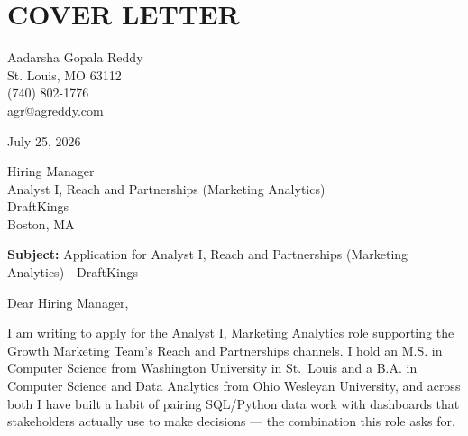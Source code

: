 \documentclass[10pt, letterpaper]{article}
\begin{document}
\vspace{\headerSpacing}
\section*{COVER LETTER}

\vspace{\headerSpacing}
\begin{onecolentry}
	Aadarsha Gopala Reddy\\
	St. Louis, MO 63112\\
	(740) 802-1776\\
	agr@agreddy.com\\
\end{onecolentry}

\vspace{\headerSpacing}
\begin{onecolentry}
	July 25, 2026\\
\end{onecolentry}

\vspace{\headerSpacing}
\begin{onecolentry}
	Hiring Manager\\
	Analyst I, Reach and Partnerships (Marketing Analytics)\\
	DraftKings\\
	Boston, MA\\
\end{onecolentry}

\vspace{\headerSpacing}
\begin{onecolentry}
	\textbf{Subject:} Application for Analyst I, Reach and Partnerships (Marketing Analytics) - DraftKings
\end{onecolentry}

\vspace{\headerSpacing}
\begin{onecolentry}
	Dear Hiring Manager,
\end{onecolentry}

\vspace{\headerSpacing}
\begin{onecolentry}
	I am writing to apply for the Analyst I, Marketing Analytics role supporting the Growth Marketing Team's Reach and Partnerships channels. I hold an M.S. in Computer Science from Washington University in St.~Louis and a B.A. in Computer Science and Data Analytics from Ohio Wesleyan University, and across both I have built a habit of pairing SQL/Python data work with dashboards that stakeholders actually use to make decisions --- the combination this role asks for.
\end{onecolentry}
\end{document}
